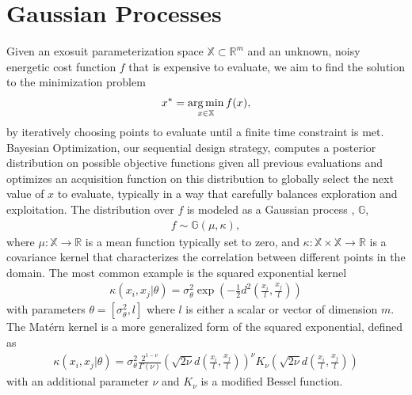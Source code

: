 \section{Gaussian Processes}
\label{gp}

Given an exosuit parameterization space $\mathbb{X} \subset \mathbb{R}^m$ and an unknown, noisy energetic cost function $f$ that is expensive to evaluate, we aim to find the solution to the minimization problem
\begin{align}
  x^* = \operatorname*{arg\,min}_{x \in \mathbb{X}} f(x),
\end{align}
by iteratively choosing points to evaluate until a finite time constraint is met. Bayesian Optimization, our sequential design strategy, computes a posterior distribution on possible objective functions given all previous evaluations and optimizes an acquisition function on this distribution to globally select the next value of $x$ to evaluate, typically in a way that carefully balances exploration and exploitation. The distribution over $f$ is modeled as a Gaussian process \citep{Rasmussen2006}, $\mathbb{G}$, 
\begin{align}
  f \sim \mathbb{G}(\mu, \kappa), 
\end{align}
where $\mu : \mathbb{X} \rightarrow \mathbb{R}$ is a mean function typically set to zero, and $\kappa : \mathbb{X}\times \mathbb{X} \rightarrow \mathbb{R}$ is a covariance kernel that characterizes the correlation between different points in the domain. The most common example is the squared exponential kernel
\begin{align}
  \kappa(x_i, x_j \vert \theta) = \sigma_\theta^2 \exp(-\frac{1}{2}d^2(\frac{x_i}{l}, \frac{x_j}{l}))
\end{align}
with parameters $\theta = [\sigma_\theta^2, l]$ where $l$ is either a scalar or vector of dimension $m$. The Matérn kernel is a more generalized form of the squared exponential, defined as
\begin{align}
	\kappa(x_i, x_j \vert \theta) = \sigma_\theta^2\frac{2^{1-\nu}}{\Gamma(\nu)}(\sqrt{2\nu} d(\frac{x_i}{l}, \frac{x_j}{l}))^\nu K_\nu (\sqrt{2\nu} d(\frac{x_i}{l}, \frac{x_j}{l}))
\end{align}
with an additional parameter $\nu$ and $K_\nu$ is a modified Bessel function. 
